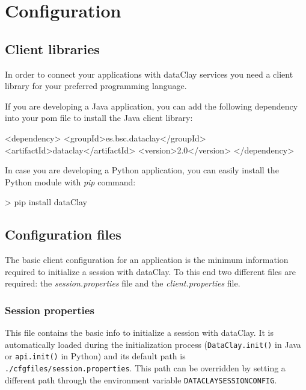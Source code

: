 
\chapter{Configuration}

\section{Client libraries}
\label{sec:ClientLibraries}

In order to connect your applications with dataClay services you need a client library for your preferred programming language.

If you are developing a Java application, you can add the following dependency into your pom file to install the Java client library:

\begin{tBox}
\footnotesize
 \begin{bash}
  <dependency>
    <groupId>es.bsc.dataclay</groupId>
    <artifactId>dataclay</artifactId>
    <version>2.0</version>
  </dependency>
 \end{bash}
\end{tBox}

In case you are developing a Python application, you can easily install the Python module with \textit{pip} command:

\begin{tBox}
\begin{bash}
> pip install dataClay
\end{bash}
\end{tBox}

\section{Configuration files}
\label{sec:ClientConfigFiles}

The basic client configuration for an application is the minimum information required to initialize a session with dataClay. To this end two different files are required: the \textit{session.properties} file and the \textit{client.properties} file.

\subsection{Session properties}
This file contains the basic info to initialize a session with dataClay. It is automatically loaded during the initialization process (\texttt{DataClay.init()} in Java or \texttt{api.init()} in Python) and its default path is \texttt{./cfgfiles/session.properties}. This path can be overridden by setting a different path through the environment variable \texttt{DATACLAYSESSIONCONFIG}. 

